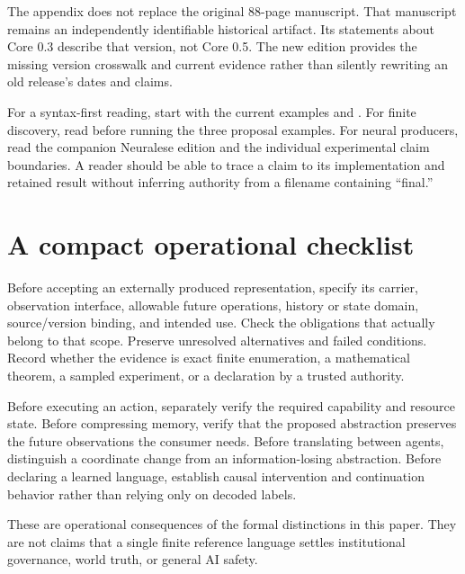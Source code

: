 \documentclass[11pt]{article}
\begin{document}
The appendix does not replace the original 88-page manuscript. That manuscript remains an independently identifiable historical artifact. Its statements about Core 0.3 describe that version, not Core 0.5. The new edition provides the missing version crosswalk and current evidence rather than silently rewriting an old release's dates and claims.

For a syntax-first reading, start with the current examples and . For finite discovery, read  before running the three proposal examples. For neural producers, read the companion Neuralese edition and the individual experimental claim boundaries. A reader should be able to trace a claim to its implementation and retained result without inferring authority from a filename containing ``final.''

\section{A compact operational checklist}
Before accepting an externally produced representation, specify its carrier, observation interface, allowable future operations, history or state domain, source/version binding, and intended use. Check the obligations that actually belong to that scope. Preserve unresolved alternatives and failed conditions. Record whether the evidence is exact finite enumeration, a mathematical theorem, a sampled experiment, or a declaration by a trusted authority.

Before executing an action, separately verify the required capability and resource state. Before compressing memory, verify that the proposed abstraction preserves the future observations the consumer needs. Before translating between agents, distinguish a coordinate change from an information-losing abstraction. Before declaring a learned language, establish causal intervention and continuation behavior rather than relying only on decoded labels.

These are operational consequences of the formal distinctions in this paper. They are not claims that a single finite reference language settles institutional governance, world truth, or general AI safety.
\end{document}
